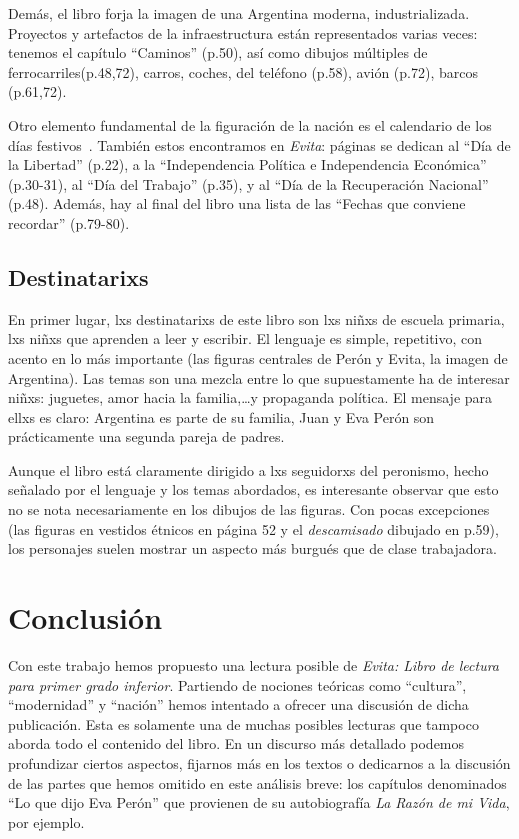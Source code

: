 \documentclass[
10pt, %
a4paper, %
oneside, %
headinclude,footinclude, %
]{scrartcl}
\begin{document}
Demás, el libro forja la imagen de una Argentina moderna, industrializada.
Proyectos y artefactos de la infraestructura están representados varias veces:
tenemos el capítulo ``Caminos'' (p.50), así como dibujos múltiples de ferrocarriles(p.48,72), carros, coches, del teléfono (p.58), avión (p.72), barcos (p.61,72).

Otro elemento fundamental de la figuración de la nación es el calendario de los días festivos~\autocite{SzIr2009}.
También estos encontramos en \textit{Evita}:
páginas se dedican al
``Día de la Libertad'' (p.22),
a la ``Independencia Política e Independencia Económica'' (p.30-31),
al ``Día del Trabajo'' (p.35),
y al ``Día de la Recuperación Nacional'' (p.48).
Además, hay al final del libro una lista de las ``Fechas que conviene recordar'' (p.79-80).


\subsection{Destinatarixs}

En primer lugar, lxs destinatarixs de este libro son lxs niñxs de escuela primaria, lxs niñxs que aprenden a leer y escribir.
El lenguaje es simple, repetitivo, con acento en lo más importante (las figuras centrales de Perón y Evita, la imagen de Argentina).
Las temas son una mezcla entre lo que supuestamente ha de interesar niñxs: juguetes, amor hacia la familia,\ldots y propaganda política.
El mensaje para ellxs es claro: Argentina es parte de su familia, Juan y Eva Perón son prácticamente una segunda pareja de padres.

Aunque el libro está claramente dirigido a lxs seguidorxs del peronismo,
hecho señalado por el lenguaje y los temas abordados,
es interesante observar que esto no se nota necesariamente en los dibujos de las figuras.
Con pocas excepciones (las figuras en vestidos étnicos en página 52 y el \textit{descamisado} dibujado en p.59),
los personajes suelen mostrar un aspecto más burgués que de clase trabajadora.

\section{Conclusión}

Con este trabajo hemos propuesto una lectura posible de \textit{Evita: Libro de lectura para primer grado inferior}.
Partiendo de nociones teóricas como ``cultura'', ``modernidad'' y ``nación'' hemos intentado a ofrecer una discusión de dicha publicación.
Esta es solamente una de muchas posibles lecturas que tampoco aborda todo el contenido del libro.
En un discurso más detallado podemos profundizar ciertos aspectos, fijarnos más en los textos o dedicarnos a la discusión de las partes que hemos omitido en este análisis breve:
los capítulos denominados ``Lo que dijo Eva Perón'' que provienen de su autobiografía \textit{La Razón de mi Vida}, por ejemplo.
\end{document}
